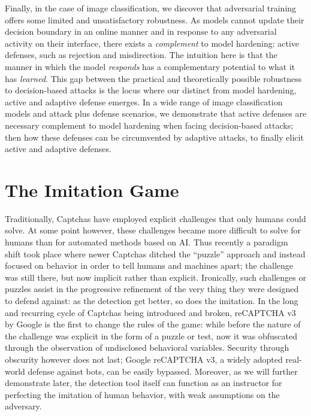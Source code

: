 Finally, in the case of image classification, we discover that adversarial training offers some limited and unsatisfactory robustness.
As models cannot update their decision boundary in an online manner and in response to
any adversarial activity on their interface, there exists a \textit{complement} to model hardening: active defenses, such as rejection and misdirection.
The intuition here is that the manner in which the model \textit{responds} has a complementary potential to what it has \textit{learned}.
This gap between the practical and theoretically possible robustness to decision-based attacks is the locus where our distinct from model hardening, active and adaptive defense emerges.
In a wide range of image classification models and attack plus defense scenarios, we demonstrate that active defenses are necessary complement to model hardening when facing decision-based attacks; then how these defenses can be circumvented by adaptive attacks, to finally elicit active and adaptive defenses.

\section{The Imitation Game}

Traditionally, Captchas have employed explicit challenges that only humans could solve.
At some point however, these challenges became more difficult to solve for humans than for automated methods based on \gls{AI}.
Thus recently a paradigm shift took place where newer Captchas ditched the ``puzzle'' approach and instead focused on behavior in order to tell humans and machines apart; the challenge was still there, but now implicit rather than explicit.
Ironically, such challenges or puzzles assist in the progressive refinement of the very thing they were designed to defend against: as the detection get better, so does the imitation.
In the long and recurring cycle of Captchas being introduced and broken, reCAPTCHA v3 by Google is the first to change the rules of the game: while before the nature of the challenge was explicit in the form of a puzzle or test, now it was obfuscated through the observation of undisclosed behavioral variables.
Security through obscurity however does not last; Google reCAPTCHA v3, a widely adopted real-world defense against bots, can be easily bypassed.
Moreover, as we will further demonstrate later, the detection tool itself can function as an instructor for perfecting the imitation of human behavior, with weak assumptions on the adversary.

